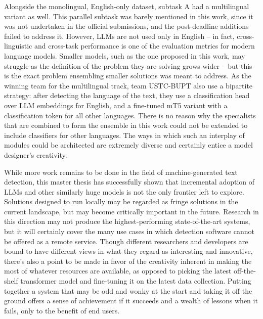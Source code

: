 Alongside the monolingual, English-only dataset, subtask A had a multilingual variant as well.
This parallel subtask was barely mentioned in this work, since it was not undertaken in the official submissions, and the post-deadline additions failed to address it.
However, LLMs are not used only in English -- in fact, cross-linguistic and cross-task performance is one of the evaluation metrics for modern language models.
Smaller models, such as the one proposed in this work, may struggle as the definition of the problem they are solving grows wider -- but this is the exact problem ensembling smaller solutions was meant to address.
As the winning team for the multilingual track, team USTC-BUPT \citep{guo2024ustc} also use a bipartite strategy: after detecting the language of the text, they use a classification head over LLM embeddings for English, and a fine-tuned mT5 variant with a classification token for all other languages.
There is no reason why the specialists that are combined to form the ensemble in this work could not be extended to include classifiers for other languages.
The ways in which such an interplay of modules could be architected are extremely diverse and certainly entice a model designer's creativity.

While more work remains to be done in the field of machine-generated text detection, this master thesis has successfully shown that incremental adoption of LLMs and other similarly huge models is not the only frontier left to explore.
Solutions designed to run locally may be regarded as fringe solutions in the current landscape, but may become critically important in the future.
Research in this direction may not produce the highest-performing state-of-the-art systems, but it will certainly cover the many use cases in which detection software cannot be offered as a remote service.
Though different researchers and developers are bound to have different views in what they regard as interesting and innovative, there's also a point to be made in favor of the creativity inherent in making the most of whatever resources are available, as opposed to picking the latest off-the-shelf transformer model and fine-tuning it on the latest data collection.
Putting together a system that may be odd and wonky at the start and taking it off the ground offers a sense of achievement if it succeeds and a wealth of lessons when it fails, only to the benefit of end users.